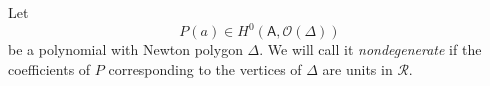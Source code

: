 \documentclass[14pt]{extarticle}
\newcommand{\bA}{\mathsf{A}}
\newcommand{\cR}{\mathscr{R}}
\newcommand{\bbA}{\overline{\bA}}
\newcommand{\cO}{\mathscr{O}}
\newcommand{\Hd}{{H}^{\raisebox{0.5mm}{$\scriptscriptstyle \bullet$}}}
\newcommand{\fa}{\mathfrak{a}}
\DeclareMathOperator{\Cone}{Cone}
\theoremstyle{definition}
\begin{document}



 \subsubsection{}\label{s_Pnondeg} 
 Let
 $$
 P(a) \in H^0(\bA,\cO(\Delta))
 $$
 be a polynomial with Newton polygon $\Delta$. We will call it
 \emph{nondegenerate} if the 
 coefficients of $P$ corresponding to the vertices of $\Delta$ are
 units in $\cR$.
\end{document}

